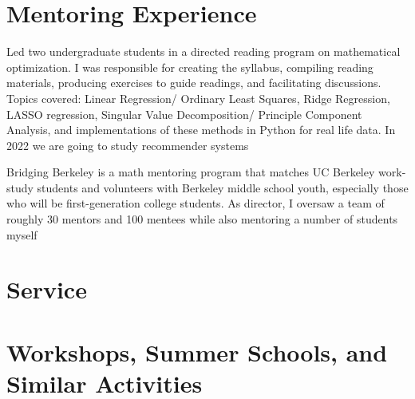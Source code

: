 \documentclass[11pt,letter]{moderncv}
\begin{document}
\section{Mentoring Experience}
\vspace{0.05in}
\begin{itemize}
 {Led two undergraduate students in a directed reading program on mathematical optimization.  I was responsible for creating the syllabus, compiling reading materials, producing exercises to guide readings, and facilitating discussions. Topics covered: Linear Regression/ Ordinary Least Squares, Ridge Regression, LASSO regression, Singular Value Decomposition/ Principle Component Analysis, and implementations of these methods in Python for real life data. In 2022 we are going to study recommender systems}{}{}{}{}
\end{itemize}
\vspace{0.05in}
\begin{itemize}
 {Bridging Berkeley is a math mentoring program that matches UC Berkeley work-study students and volunteers with Berkeley middle school youth, especially those who will be first-generation college students. As director, I oversaw a team of roughly 30 mentors and 100 mentees while also mentoring a number of students myself}{}{}{}{}
\end{itemize}
\vspace{0.05in}


\section{Service}

\section{Workshops, Summer Schools, and Similar Activities}
\vspace{0.05in}
\vspace{0.05in}
\vspace{0.05in}
\vspace{0.05in}
\end{document}
